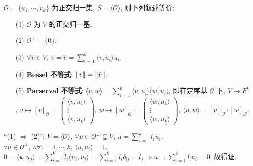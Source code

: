 \documentclass{note}
\begin{document}
\begin{thm}
    $\mathcal{O}=\{u_1,\cdots,u_k\}$ 为正交归一集, $S=\langle\mathcal{O}\rangle$, 则下列叙述等价:
    \begin{itemize}
        \item[(1)] $\mathcal{O}$ 为 $V$ 的正交归一基.
        \item[(2)] $\mathcal{O}^{\perp}=\{0\}$.
        \item[(3)] $\forall v\in V$, $v=\hat{v}=\sum_{i=1}^k\langle v,u_i\rangle u_i$.
        \item[(4)] \textbf{Bessel 不等式}: $\left\lVert v\right\rVert=\left\lVert\hat{v}\right\rVert$.
        \item[(5)] \textbf{Parserval 不等式}: $\langle v,w\rangle=\sum_{i=1}^k\langle v,u_i\rangle\overline{\langle w,u_i\rangle}$, 即在定序基 $\mathcal{O}$ 下, $V\rightarrow F^k$, $v\mapsto[v]_{\mathcal{O}}=\begin{pmatrix}
            \langle v,u_1\rangle\\
            \vdots\\
            \langle v,u_k\rangle
        \end{pmatrix}$, $w\mapsto[w]_{\mathcal{O}}=\begin{pmatrix}
            \langle w,u_1\rangle\\
            \vdots\\
            \langle w,u_k\rangle
        \end{pmatrix}$, $\langle u,w\rangle=[v]_{\mathcal{O}}\cdot[w]_{\mathcal{O}}$.
    \end{itemize}
\end{thm}
\begin{pf}
    ``(1) $\Longrightarrow$ (2)'': $V=\langle\mathcal{O}\rangle$, $\forall u\in\mathcal{O}^{\perp}\subseteq V$, $u=\sum_{i=1}^kl_iu_i$.\\
    $\because u\in\mathcal{O}^{\perp}$, $\therefore\forall i=1,\cdots,k$, $\langle u,u_i\rangle=0$.\\
    $0=\langle u,u_j\rangle=\sum_{i=1}^kl_i\langle u_i,u_j\rangle=\sum_{i=1}^kl_i\delta_{ij}=l_j\Longrightarrow u=\sum_{i=1}^kl_iu_i=0$, 故得证.
\end{pf}
\end{document}
